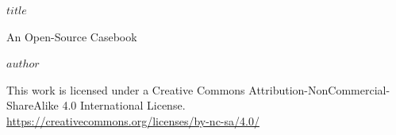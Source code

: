 \color{OffBlack}

{\clearpage}{}

\blankpage

\clearpage

\frontmatter

\thispagestyle{empty}

\begin{flushright}

\vspace*{50mm}

{\bfseries\Huge{$title$}} 

{\bfseries\vspace{5mm}}

{\Large{An Open-Source Casebook}} 

\vspace{20mm}

{\normalsize{$author$}} 

\vspace*{\fill}

\begin{small}



\rmfamily{\monthyear} 

\end{small}

\end{flushright}

\clearpage

\thispagestyle{empty}
\begingroup
\parindent 0pt
\vspace*{\fill}


\begin{small}
\raggedright{This work is licensed under a Creative Commons Attribution-NonCommercial-ShareAlike 4.0 International License.} \\
\url{https://creativecommons.org/licenses/by-nc-sa/4.0/}
\end{small}

\vspace{1em}

